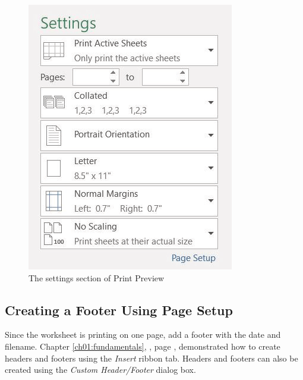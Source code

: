 \begin{figure}[H]
	\centering
	\includegraphics[width=\maxwidth{.95\linewidth}]{gfx/ch02_fig43}
	\caption{The settings section of Print Preview}
	\label{02:fig43}
\end{figure}

\subsection{Creating a Footer Using Page Setup}

Since the worksheet is printing on one page, add a footer with the date and filename. Chapter \ref{ch01:fundamentals}, , page \pageref{ch01:fundamentals}, demonstrated how to create headers and footers using the \textit{Insert} ribbon tab. Headers and footers can also be created using the \textit{Custom Header/Footer} dialog box.


